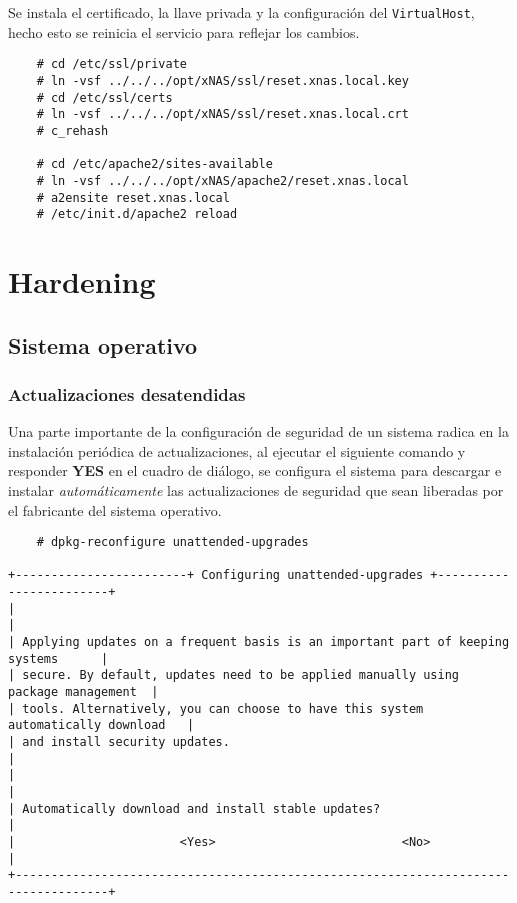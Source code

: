 Se instala el certificado, la llave privada y la configuraci\'{o}n del \texttt{VirtualHost}, hecho esto se reinicia el servicio para reflejar los cambios.

{
\scriptsize
\linespread{1}
\begin{verbatim}
    # cd /etc/ssl/private
    # ln -vsf ../../../opt/xNAS/ssl/reset.xnas.local.key
    # cd /etc/ssl/certs
    # ln -vsf ../../../opt/xNAS/ssl/reset.xnas.local.crt
    # c_rehash

    # cd /etc/apache2/sites-available
    # ln -vsf ../../../opt/xNAS/apache2/reset.xnas.local
    # a2ensite reset.xnas.local
    # /etc/init.d/apache2 reload
\end{verbatim}
}

    \section {Hardening}

      \subsection {Sistema operativo}

        \subsubsection {Actualizaciones desatendidas}

Una parte importante de la configuraci\'{o}n de seguridad de un sistema radica en la instalaci\'{o}n peri\'{o}dica de actualizaciones, al ejecutar el siguiente comando y responder \textbf{YES} en el cuadro de di\'{a}logo, se configura el sistema para descargar e instalar \emph{autom\'{a}ticamente} las actualizaciones de seguridad que sean liberadas por el fabricante del sistema operativo.

{
\scriptsize
\linespread{1}
\begin{verbatim}
    # dpkg-reconfigure unattended-upgrades

+------------------------+ Configuring unattended-upgrades +------------------------+
|                                                                                   |
| Applying updates on a frequent basis is an important part of keeping systems      |
| secure. By default, updates need to be applied manually using package management  |
| tools. Alternatively, you can choose to have this system automatically download   |
| and install security updates.                                                     |
|                                                                                   |
| Automatically download and install stable updates?                                |
|                       <Yes>                          <No>                         |
+-----------------------------------------------------------------------------------+
\end{verbatim}
}

